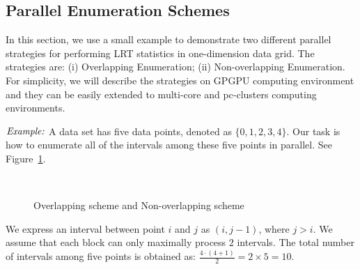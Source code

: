 \documentclass[10pt,journal,cspaper,compsoc]{IEEEtran}
\begin{document}
\subsection{Parallel Enumeration Schemes}
\label{sec:mov1}
In this section, we use a small example to demonstrate two different parallel strategies for performing LRT statistics in one-dimension data grid. The strategies are: (i) Overlapping Enumeration; (ii) Non-overlapping Enumeration. For simplicity, we will describe the strategies on GPGPU computing environment and they can be easily extended to multi-core and pc-clusters computing environments.

$\noindent \textit {Example:}$  A data set has five data points, denoted as $\{0,1,2,3,4\}$. Our task is how to enumerate all of the intervals among these five points in parallel. See Figure~\ref{example1}.

\begin{figure}[h]
\centering
{}
~~\\
\caption{Overlapping scheme and Non-overlapping scheme}\label{example1}
\end{figure}

 We express an interval between point $i$ and $j$ as $(i,j-1)$, where $j > i$. We assume that each block can only maximally process $2$ intervals. The total number of intervals among five points is obtained as: ${\frac{4 \cdot (4+1)}{2}}=2\times 5=10$.
\end{document}
